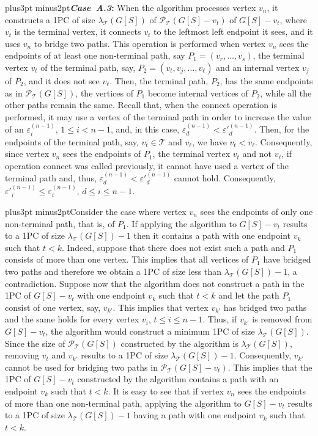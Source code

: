 \documentclass[10pt]{article}
\def\yskip{\penalty-50\vskip3pt plus3pt minus2pt}
\def\y{\yskip}
\begin{document}
{\y {\bf \textit{Case~A.3}:} When the algorithm processes vertex
$v_n$, it constructs a 1PC of size $\lambda_\mathcal{T}(G[S])$ of
$\mathcal{P_{\mathcal{T}}}(G[S]-v_t)$ of $G[S]-v_t$, where $v_t$
is the terminal vertex, it connects $v_t$ to the leftmost left
endpoint it sees, and it uses $v_n$ to bridge two paths. This
operation is performed when vertex $v_n$ sees the endpoints of at
least one non-terminal path, say $P_1=(v_r, \ldots, v_s)$, the
terminal vertex $v_t$ of the terminal path, say, $P_2=(v_t, v_j,
\ldots, v_\ell)$ and an internal vertex $v_j$ of $P_2$, and it
does not see $v_\ell$. Then, the terminal path, $P_2$, has the
same endpoints as in $\mathcal{P_{\mathcal{T}}}(G[S])$, the
vertices of $P_1$ become internal vertices of $P_2$, while all the
other paths remain the same. Recall that, when the connect
operation is performed, it may use a vertex of the terminal path
in order to increase the value of an $\varepsilon^{(n-1)}_i$, $1
\leq i < n-1$, and, in this case,
$\varepsilon^{(n-1)}_d<\varepsilon'^{(n-1)}_d$. Then, for the
endpoints of the terminal path, say, $v_t \in \mathcal{T}$ and
$v_\ell$, we have $v_t<v_\ell$. Consequently, since vertex $v_n$
sees the endpoints of $P_1$, the terminal vertex $v_t$ and not
$v_\ell$, if operation connect was called previously, it cannot
have used a vertex of the terminal path and, thus,
$\varepsilon^{(n-1)}_d<\varepsilon'^{(n-1)}_d$ cannot hold.
Consequently, $\varepsilon'^{(n-1)}_i \leq \varepsilon^{(n-1)}_i$,
$d \leq i \leq n-1$.

\y Consider the case where vertex $v_n$ sees the endpoints of only
one non-terminal path, that is, of $P_1$. If applying the
algorithm to $G[S]-v_t$ results to a 1PC of size
$\lambda_\mathcal{T}(G[S])-1$ then it contains a path with one
endpoint $v_k$ such that $t<k$. Indeed, suppose that there does
not exist such a path and $P_1$ consists of more than one vertex.
This implies that all vertices of $P_1$ have bridged two paths and
therefore we obtain a 1PC of size less than
$\lambda_\mathcal{T}(G[S])-1$, a contradiction. Suppose now that
the algorithm does not construct a path in the 1PC of $G[S]-v_t$
with one endpoint $v_k$ such that $t<k$ and let the path $P_1$
consist of one vertex, say, $v_{k'}$. This implies that vertex
$v_{k'}$ has bridged two paths and the same holds for every vertex
$v_i$, $t \leq i \leq n-1$. Thus, if $v_{k'}$ is removed from
$G[S]-v_t$, the algorithm would construct a minimum 1PC of size
$\lambda_\mathcal{T}(G[S])$. Since the size of
$\mathcal{P_{\mathcal{T}}}(G[S])$ constructed by the algorithm is
$\lambda_\mathcal{T}(G[S])$, removing $v_t$ and $v_{k'}$ results
to a 1PC of size $\lambda_\mathcal{T}(G[S])-1$. Consequently,
$v_{k'}$ cannot be used for bridging two paths in
$\mathcal{P_{\mathcal{T}}}(G[S]-v_t)$. This implies that the 1PC
of $G[S]-v_t$ constructed by the algorithm contains a path with an
endpoint $v_k$ such that $t<k$. It is easy to see that if vertex
$v_n$ sees the endpoints of more than one non-terminal path,
applying the algorithm to $G[S]-v_t$ results to a 1PC of size
$\lambda_\mathcal{T}(G[S])-1$ having a path with one endpoint
$v_k$ such that $t<k$.

}
\end{document}
